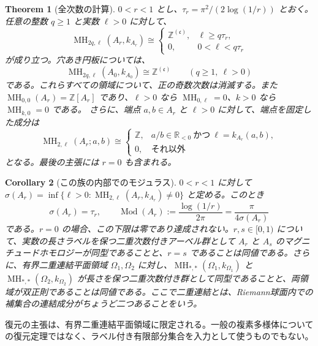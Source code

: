 \documentclass[12pt]{amsart}
\newtheorem{thm}{Theorem}[section]
\newtheorem{cor}[thm]{Corollary}
\theoremstyle{definition}
\theoremstyle{remark}
\numberwithin{equation}{section}
\newcommand{\R}{\mathbb{R}}
\newcommand{\Z}{\mathbb{Z}}
\DeclareMathOperator{\MH}{MH}
\begin{document}
\begin{thm}[全次数の計算]\label{thm:calculation}
$0<r<1$ とし、$\tau_r=\pi^2/(2\log(1/r))$ とおく。任意の整数 $q\ge1$ と実数 $\ell>0$ に対して、
\begin{equation}\label{eq:annulus-homology}
 \MH_{2q,\ell}(A_r,k_{A_r})\cong
 \begin{cases}\Z^{(\mathfrak c)},&\ell\ge q\tau_r,\\0,&0<\ell<q\tau_r\end{cases}
\end{equation}
が成り立つ。穴あき円板については、
\begin{equation}\label{eq:cusp-homology}
 \MH_{2q,\ell}(A_0,k_{A_0})\cong\Z^{(\mathfrak c)}\qquad(q\ge1,\ \ell>0)
\end{equation}
である。これらすべての領域について、正の奇数次数は消滅する。また $\MH_{0,0}(A_r)=\Z[A_r]$ であり、$\ell>0$ なら $\MH_{0,\ell}=0$、$k>0$ なら $\MH_{k,0}=0$ である。
さらに、端点 $a,b\in A_r$ と $\ell>0$ に対して、端点を固定した成分は
\begin{equation}\label{eq:endpoint-homology}
 \MH_{2,\ell}(A_r;a,b)\cong
 \begin{cases}\Z,& a/b\in\R_{<0}\ \text{かつ}\ \ell=k_{A_r}(a,b),\\0,&\text{それ以外}
 \end{cases}
\end{equation}
となる。最後の主張には $r=0$ も含まれる。
\end{thm}

\begin{cor}[この族の内部でのモジュラス]\label{cor:modulus}
$0<r<1$ に対して $\sigma(A_r)=\inf\{\ell>0:\MH_{2,\ell}(A_r,k_{A_r})\ne0\}$ と定める。このとき
\begin{equation}\label{eq:modulus}
 \sigma(A_r)=\tau_r,\qquad
 \operatorname{Mod}(A_r):=\frac{\log(1/r)}{2\pi}=\frac{\pi}{4\sigma(A_r)}
\end{equation}
である。$r=0$ の場合、この下限は零であり達成されない。$r,s\in[0,1)$ について、実数の長さラベルを保つ二重次数付きアーベル群として $A_r$ と $A_s$ のマグニチュードホモロジーが同型であることと、$r=s$ であることは同値である。さらに、有界二重連結平面領域 $\Omega_1,\Omega_2$ に対し、$\MH_{*,*}(\Omega_1,k_{\Omega_1})$ と $\MH_{*,*}(\Omega_2,k_{\Omega_2})$ が長さを保つ二重次数付き群として同型であることと、両領域が双正則であることは同値である。ここで二重連結とは、Riemann球面内での補集合の連結成分がちょうど二つあることをいう。
\end{cor}
復元の主張は、有界二重連結平面領域に限定される。一般の複素多様体についての復元定理ではなく、ラベル付き有限部分集合を入力として使うものでもない。
\end{document}
